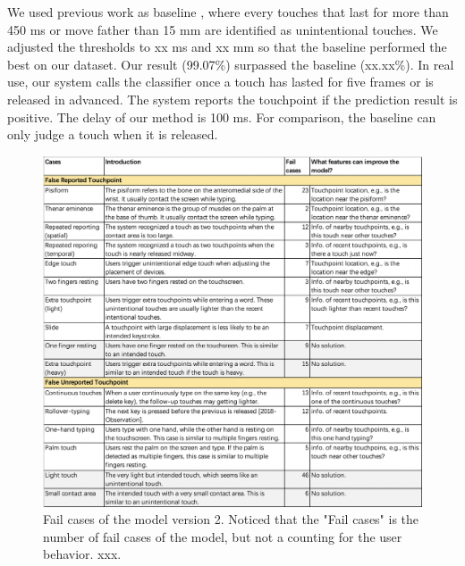 We used previous work as baseline \cite{2013-TapBoard}, where every touches that last for more than 450 ms or move father than 15 mm are identified as unintentional touches. We adjusted the thresholds to xx ms and xx mm so that the baseline performed the best on our dataset. Our result (99.07\%) surpassed the baseline (xx.xx\%). In real use, our system calls the classifier once a touch has lasted for five frames or is released in advanced. The system reports the touchpoint if the prediction result is positive. The delay of our method is 100 ms. For comparison, the baseline can only judge a touch when it is released.



\begin{figure}[!tbh]
	\includegraphics[width=1.0\linewidth]{figures/fail_cases.png}
	\centering
	\caption{Fail cases of the model version 2. Noticed that the "Fail cases" is the number of fail cases of the model, but not a counting for the user behavior. xxx.}
	\label{fig:fail_cases}
\end{figure}

